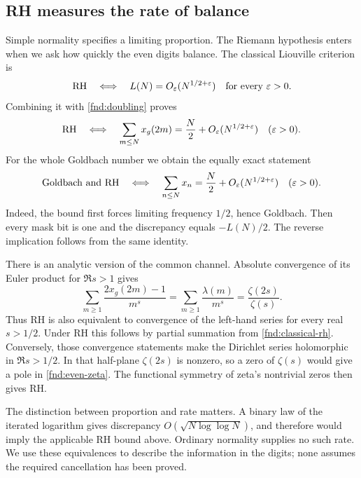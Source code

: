 \subsection{RH measures the rate of balance}

Simple normality specifies a limiting proportion.  The Riemann
hypothesis enters when we ask how quickly the even digits balance.
The classical Liouville criterion \cite[Theorem 1.1]{fndHumphries2013}
is
\begin{equation}
 \mathrm{RH}\quad\Longleftrightarrow\quad
 L(N)=O_\varepsilon(N^{1/2+\varepsilon})
 \quad\text{for every }\varepsilon>0.
 \label{fnd:classical-rh}
\end{equation}
Combining it with \eqref{fnd:doubling} proves
\begin{equation}
 \mathrm{RH}\quad\Longleftrightarrow\quad
 \sum_{m\le N}x_g(2m)=\frac N2+
 O_\varepsilon(N^{1/2+\varepsilon})
 \quad(\varepsilon>0).
 \label{fnd:even-rh}
\end{equation}
For the whole Goldbach number we obtain the equally exact statement
\begin{equation}
 \mathrm{Goldbach}\text{ and }\mathrm{RH}\quad\Longleftrightarrow\quad
 \sum_{n\le N}x_n=\frac N2+
 O_\varepsilon(N^{1/2+\varepsilon})
 \quad(\varepsilon>0).
 \label{fnd:whole-rh}
\end{equation}
Indeed, the bound first forces limiting frequency $1/2$, hence
Goldbach.  Then every mask bit is one and the discrepancy equals
$-L(N)/2$.  The reverse implication follows from the same identity.

There is an analytic version of the common channel.  Absolute
convergence of its Euler product for $\Re s>1$ gives
\begin{equation}
 \sum_{m\ge1}\frac{2x_g(2m)-1}{m^s}
 =\sum_{m\ge1}\frac{\lambda(m)}{m^s}
 =\frac{\zeta(2s)}{\zeta(s)}.
 \label{fnd:even-zeta}
\end{equation}
Thus RH is also equivalent to convergence of the left-hand series
for every real $s>1/2$.  Under RH this follows by partial summation
from \eqref{fnd:classical-rh}.  Conversely, those convergence
statements make the Dirichlet series holomorphic in $\Re s>1/2$.
In that half-plane $\zeta(2s)$ is nonzero, so a zero of $\zeta(s)$
would give a pole in \eqref{fnd:even-zeta}.  The functional symmetry
of zeta's nontrivial zeros then gives RH.

The distinction between proportion and rate matters.  A binary
law of the iterated logarithm gives discrepancy
$O(\sqrt{N\log\log N})$, and therefore would imply the applicable
RH bound above.  Ordinary normality supplies no such rate.  We use
these equivalences to describe the information in the digits; none
assumes the required cancellation has been proved.

